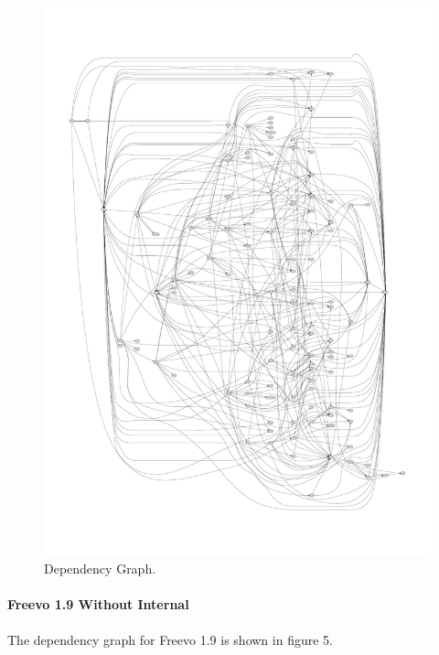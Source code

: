 \documentclass[10.5pt,journal, a4paper]{IEEEtran}
\begin{document}
\begin{figure}[H]
 \centering 
 \includegraphics[width=\columnwidth]{freevo18less}
 \centering 
  \caption {Dependency Graph. }
 \end{figure}



\paragraph{Freevo 1.9 Without Internal}
\noindent
The dependency graph for Freevo 1.9 is shown in figure 5.
\end{document}
